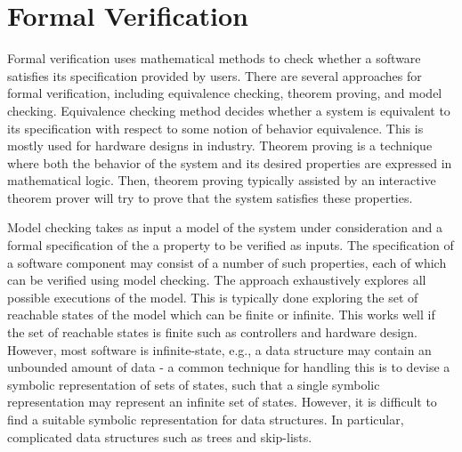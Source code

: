 \section*{Formal Verification} 
Formal verification uses mathematical methods to check whether a software  satisfies its specification  provided by users. 
There are several approaches for  formal verification, including equivalence checking, theorem proving, and model checking. Equivalence checking method decides whether a system is equivalent to its specification with respect to some notion of behavior  equivalence. This is mostly used for hardware designs in industry. Theorem proving is a technique where both the behavior of the system and its desired properties are expressed in mathematical logic. Then, theorem proving  typically assisted by an interactive theorem prover  will try to prove that the system satisfies these properties. 

Model checking takes as input a model of the system  under
consideration and a formal specification of the a property to be verified as inputs. The specification of a software component may consist of a number of such properties, each of which can be verified using model checking. The approach exhaustively explores all possible executions of the model. This is typically done exploring the set of reachable states of the model  which can be finite or infinite. 
This works well if the set of reachable states is finite such as  controllers and hardware design.   However, most software is infinite-state, e.g., a data structure may contain an unbounded amount of data - a common technique for handling this is to devise a symbolic representation of sets of states, such that a single symbolic representation may represent  an infinite set of states.  However, it is difficult to find a suitable symbolic representation for data structures. In particular, complicated data structures such as trees and skip-lists.



